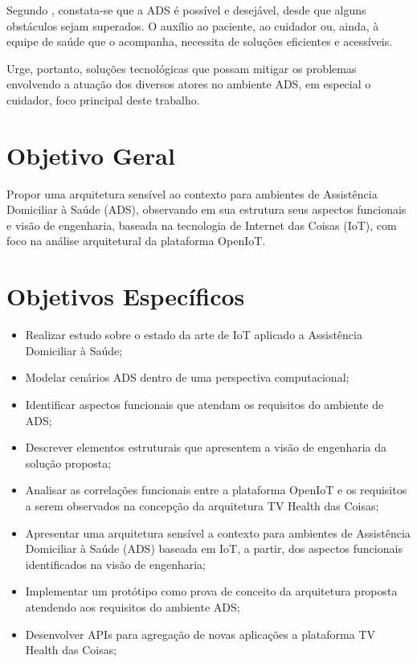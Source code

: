 Segundo , constata-se que a ADS é possível e desejável,
desde que alguns obstáculos sejam superados.  O auxílio ao paciente, ao
cuidador ou, ainda, à equipe de saúde que o acompanha, necessita de soluções
eficientes e acessíveis.

Urge, portanto, soluções tecnológicas que possam mitigar os problemas envolvendo
a atuação dos diversos atores no ambiente ADS, em especial o cuidador,
foco principal deste trabalho.

\section{Objetivo Geral}\label{sec:objetivos}

Propor uma arquitetura sensível ao contexto para ambientes de Assistência
Domiciliar à Saúde (ADS), observando em sua estrutura seus aspectos
funcionais e visão de engenharia, baseada na tecnologia de Internet das Coisas
(IoT), com foco na análise arquitetural da plataforma OpenIoT.

\section{Objetivos Específicos}

\begin{itemize}
  \item Realizar estudo sobre o estado da arte de IoT aplicado a Assistência
    Domiciliar à Saúde;
  \item Modelar cenários ADS dentro de uma perspectiva computacional;
  \item Identificar aspectos funcionais que atendam os requisitos do ambiente
    de ADS;
  \item Descrever elementos estruturais que apresentem a visão de engenharia da
    solução proposta;
  \item Analisar as correlações funcionais entre a plataforma OpenIoT e os
    requisitos a serem observados na concepção da arquitetura TV Health das
    Coisas;
  \item Apresentar uma arquitetura sensível a contexto para ambientes de
    Assistência Domiciliar à Saúde (ADS) baseada em IoT, a partir, dos aspectos
    funcionais identificados na visão de engenharia;
  \item Implementar um protótipo como prova de conceito da arquitetura proposta
    atendendo aos requisitos do ambiente ADS;
  \item Desenvolver APIs para agregação de novas aplicações a plataforma TV
    Health das Coisas;
\end{itemize}

